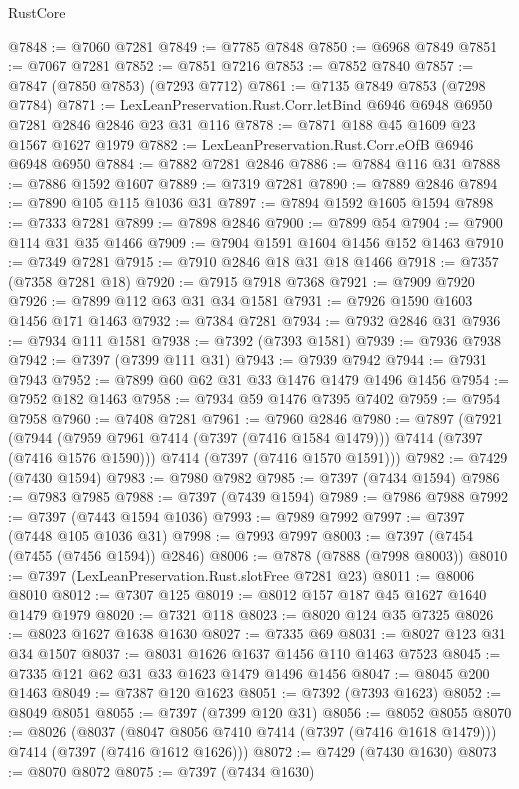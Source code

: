 \begin{lexlean}{RustCore}
\begin{coremodule}
@7848 := @7060 @7281
@7849 := @7785 @7848
@7850 := @6968 @7849
@7851 := @7067 @7281
@7852 := @7851 @7216
@7853 := @7852 @7840
@7857 := @7847 (@7850 @7853) (@7293 @7712)
@7861 := @7135 @7849 @7853 (@7298 @7784)
@7871 := LexLeanPreservation.Rust.Corr.letBind @6946 @6948 @6950 @7281 @2846 @2846 @23 @31 @116
@7878 := @7871 @188 @45 @1609 @23 @1567 @1627 @1979
@7882 := LexLeanPreservation.Rust.Corr.eOfB @6946 @6948 @6950
@7884 := @7882 @7281 @2846
@7886 := @7884 @116 @31
@7888 := @7886 @1592 @1607
@7889 := @7319 @7281
@7890 := @7889 @2846
@7894 := @7890 @105 @115 @1036 @31
@7897 := @7894 @1592 @1605 @1594
@7898 := @7333 @7281
@7899 := @7898 @2846
@7900 := @7899 @54
@7904 := @7900 @114 @31 @35 @1466
@7909 := @7904 @1591 @1604 @1456 @152 @1463
@7910 := @7349 @7281
@7915 := @7910 @2846 @18 @31 @18 @1466
@7918 := @7357 (@7358 @7281 @18)
@7920 := @7915 @7918 @7368
@7921 := @7909 @7920
@7926 := @7899 @112 @63 @31 @34 @1581
@7931 := @7926 @1590 @1603 @1456 @171 @1463
@7932 := @7384 @7281
@7934 := @7932 @2846 @31
@7936 := @7934 @111 @1581
@7938 := @7392 (@7393 @1581)
@7939 := @7936 @7938
@7942 := @7397 (@7399 @111 @31)
@7943 := @7939 @7942
@7944 := @7931 @7943
@7952 := @7899 @60 @62 @31 @33 @1476 @1479 @1496 @1456
@7954 := @7952 @182 @1463
@7958 := @7934 @59 @1476 @7395 @7402
@7959 := @7954 @7958
@7960 := @7408 @7281
@7961 := @7960 @2846
@7980 := @7897
    (@7921
      (@7944 (@7959 @7961 @7414 (@7397 (@7416 @1584 @1479))) @7414 (@7397 (@7416 @1576 @1590)))
      @7414
      (@7397 (@7416 @1570 @1591)))
@7982 := @7429 (@7430 @1594)
@7983 := @7980 @7982
@7985 := @7397 (@7434 @1594)
@7986 := @7983 @7985
@7988 := @7397 (@7439 @1594)
@7989 := @7986 @7988
@7992 := @7397 (@7443 @1594 @1036)
@7993 := @7989 @7992
@7997 := @7397 (@7448 @105 @1036 @31)
@7998 := @7993 @7997
@8003 := @7397 (@7454 (@7455 (@7456 @1594)) @2846)
@8006 := @7878 (@7888 (@7998 @8003))
@8010 := @7397 (LexLeanPreservation.Rust.slotFree @7281 @23)
@8011 := @8006 @8010
@8012 := @7307 @125
@8019 := @8012 @157 @187 @45 @1627 @1640 @1479 @1979
@8020 := @7321 @118
@8023 := @8020 @124 @35 @7325
@8026 := @8023 @1627 @1638 @1630
@8027 := @7335 @69
@8031 := @8027 @123 @31 @34 @1507
@8037 := @8031 @1626 @1637 @1456 @110 @1463 @7523
@8045 := @7335 @121 @62 @31 @33 @1623 @1479 @1496 @1456
@8047 := @8045 @200 @1463
@8049 := @7387 @120 @1623
@8051 := @7392 (@7393 @1623)
@8052 := @8049 @8051
@8055 := @7397 (@7399 @120 @31)
@8056 := @8052 @8055
@8070 := @8026
    (@8037 (@8047 @8056 @7410 @7414 (@7397 (@7416 @1618 @1479))) @7414 (@7397 (@7416 @1612 @1626)))
@8072 := @7429 (@7430 @1630)
@8073 := @8070 @8072
@8075 := @7397 (@7434 @1630)

\end{coremodule}
\end{lexlean}
